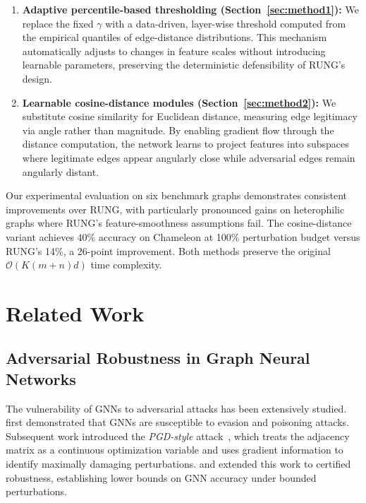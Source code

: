 \documentclass[sigconf]{acmart}
\begin{document}
\begin{enumerate}
\item \textbf{Adaptive percentile-based thresholding (Section~\ref{sec:method1}):} We replace the fixed $\gamma$ with a data-driven, layer-wise threshold computed from the empirical quantiles of edge-distance distributions. This mechanism automatically adjusts to changes in feature scales without introducing learnable parameters, preserving the deterministic defensibility of RUNG's design.

\item \textbf{Learnable cosine-distance modules (Section~\ref{sec:method2}):} We substitute cosine similarity for Euclidean distance, measuring edge legitimacy via angle rather than magnitude. By enabling gradient flow through the distance computation, the network learns to project features into subspaces where legitimate edges appear angularly close while adversarial edges remain angularly distant.
\end{enumerate}

Our experimental evaluation on six benchmark graphs demonstrates consistent improvements over RUNG, with particularly pronounced gains on heterophilic graphs where RUNG's feature-smoothness assumptions fail. The cosine-distance variant achieves $40\%$ accuracy on Chameleon at 100\% perturbation budget versus RUNG's 14\%, a 26-point improvement. Both methods preserve the original $\mathcal{O}(K(m+n)d)$ time complexity.

\section{Related Work}

\subsection{Adversarial Robustness in Graph Neural Networks}

The vulnerability of GNNs to adversarial attacks has been extensively studied. \citet{zugner2018adversarial} first demonstrated that GNNs are susceptible to evasion and poisoning attacks. Subsequent work introduced the \emph{PGD-style} attack~\cite{xu2019pgd}, which treats the adjacency matrix as a continuous optimization variable and uses gradient information to identify maximally damaging perturbations. \citet{sun2021adversarial} and \citet{zugner2019certifying} extended this work to certified robustness, establishing lower bounds on GNN accuracy under bounded perturbations.
\end{document}
